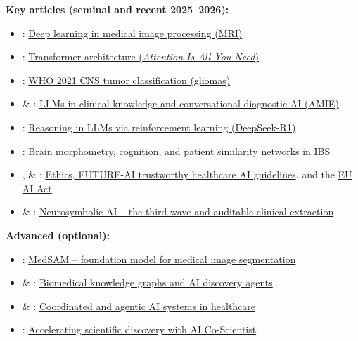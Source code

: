 \documentclass[11pt,a4paper]{article}
\begin{document}
\textbf{Key articles (seminal and recent 2025--2026):}
\begin{itemize}[nosep]
    \item \citet{lundervold2019overview}: \href{https://doi.org/10.1016/j.zemedi.2018.11.002}{Deep learning in medical image processing (MRI)}
    \item \citet{vaswani2017attention}: \href{https://arxiv.org/abs/1706.03762}{Transformer architecture (\emph{Attention Is All You Need})}
    \item \citet{louis2021who}: \href{https://doi.org/10.1093/neuonc/noab106}{WHO 2021 CNS tumor classification (gliomas)}
    \item \citet{singhal2023large} \& \citet{tu2025amie}: \href{https://doi.org/10.1038/s41586-025-08866-7}{LLMs in clinical knowledge and conversational diagnostic AI (AMIE)}
    \item \citet{deepseek2025r1}: \href{https://doi.org/10.1038/s41586-025-09422-z}{Reasoning in LLMs via reinforcement learning (DeepSeek-R1)}
    \item \citet{lundervold2025psn}: \href{https://doi.org/10.3390/diagnostics15040470}{Brain morphometry, cognition, and patient similarity networks in IBS}
    \item \citet{morley2020ethics}, \citet{lekadir2025futureai} \& \citet{eu2024aiact}: \href{https://doi.org/10.1136/bmj-2024-081554}{Ethics, FUTURE-AI trustworthy healthcare AI guidelines}, and the \href{https://artificialintelligenceact.eu}{EU AI Act}
    \item \citet{garcez2023neurosymbolic} \& \citet{prenosil2025neurosymbolic}: \href{https://doi.org/10.1038/s43856-025-01194-x}{Neurosymbolic AI -- the third wave and auditable clinical extraction}
\end{itemize}

\textbf{Advanced (optional):}
\begin{itemize}[nosep]
    \item \citet{ma2024medsam}: \href{https://doi.org/10.1038/s41467-024-44824-z}{MedSAM -- foundation model for medical image segmentation}
    \item \citet{nicholson2020knowledge} \& \citet{gao2024biomedagents}: \href{https://doi.org/10.1016/j.cell.2024.09.022}{Biomedical knowledge graphs and AI discovery agents}
    \item \citet{moritz2025agents} \& \citet{collaco2026agentic}: \href{https://doi.org/10.1038/s41746-026-02517-5}{Coordinated and agentic AI systems in healthcare}
    \item \citet{gottweis2026coscientist}: \href{https://doi.org/10.1038/s41586-026-10644-y}{Accelerating scientific discovery with AI Co-Scientist}
\end{itemize}
\end{document}
